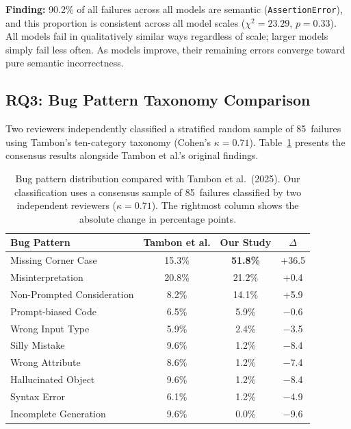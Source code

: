 \documentclass[smallextended]{svjour3}
\begin{document}
\begin{tcolorbox}[colback=gray!5, colframe=gray!40, title=Summary for RQ2]
\textbf{Finding:} 90.2\% of all failures across all models are semantic (\texttt{AssertionError}), and this proportion is consistent across all model scales ($\chi^2 = 23.29$, $p = 0.33$). All models fail in qualitatively similar ways regardless of scale; larger models simply fail less often. As models improve, their remaining errors converge toward pure semantic incorrectness.
\end{tcolorbox}

\subsection{RQ3: Bug Pattern Taxonomy Comparison}
\label{sec:rq3}

Two reviewers independently classified a stratified random sample of 85~failures using Tambon's ten-category taxonomy (Cohen's $\kappa = 0.71$). Table~\ref{tab:tambon_class} presents the consensus results alongside Tambon et al.'s original findings.

\begin{table}[t]
\centering
\caption{Bug pattern distribution compared with Tambon et al.\ (2025). Our classification uses a consensus sample of 85~failures classified by two independent reviewers ($\kappa = 0.71$). The rightmost column shows the absolute change in percentage points.}
\label{tab:tambon_class}
\begin{tabular}{lccc}
\toprule
Bug Pattern & Tambon et al. & Our Study & $\Delta$ \\
\midrule
Missing Corner Case & 15.3\% & \textbf{51.8\%} & +36.5 \\
Misinterpretation & 20.8\% & 21.2\% & +0.4 \\
Non-Prompted Consideration & 8.2\% & 14.1\% & +5.9 \\
Prompt-biased Code & 6.5\% & 5.9\% & $-$0.6 \\
Wrong Input Type & 5.9\% & 2.4\% & $-$3.5 \\
Silly Mistake & 9.6\% & 1.2\% & $-$8.4 \\
Wrong Attribute & 8.6\% & 1.2\% & $-$7.4 \\
Hallucinated Object & 9.6\% & 1.2\% & $-$8.4 \\
Syntax Error & 6.1\% & 1.2\% & $-$4.9 \\
Incomplete Generation & 9.6\% & 0.0\% & $-$9.6 \\
\bottomrule
\end{tabular}
\end{table}
\end{document}
